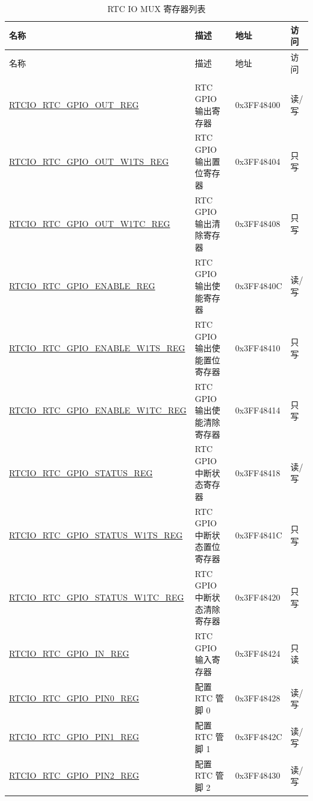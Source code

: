 \begin{longtable}{ | p{6.7cm} | p{6.5cm} | p{1.9cm} | p{0.9cm} | }
\caption{RTC IO MUX 寄存器列表}
\\\hline\rowcolor{lightgray}
名称 & 描述 &  地址 & 访问 \\ \hline
\endfirsthead
\hline\rowcolor{lightgray}
名称 & 描述 &  地址 & 访问 \\ \hline
\endhead
\endfoot
\multicolumn{4}{|l|}{\textbf{GPIO 配置／数据寄存器}} \\ \hline
\hyperref[regdesc:RTCIORTCGPIOOUTREG]{RTCIO\_RTC\_GPIO\_OUT\_REG} & RTC GPIO 输出寄存器 & 0x3FF48400 & 读/写 \\ \hline
\hyperref[regdesc:RTCIORTCGPIOOUTW1TSREG]{RTCIO\_RTC\_GPIO\_OUT\_W1TS\_REG} & RTC GPIO 输出置位寄存器 & 0x3FF48404 & 只写 \\ \hline
\hyperref[regdesc:RTCIORTCGPIOOUTW1TCREG]{RTCIO\_RTC\_GPIO\_OUT\_W1TC\_REG} & RTC GPIO 输出清除寄存器 & 0x3FF48408 & 只写 \\ \hline
\hyperref[regdesc:RTCIORTCGPIOENABLEREG]{RTCIO\_RTC\_GPIO\_ENABLE\_REG} & RTC GPIO 输出使能寄存器 & 0x3FF4840C & 读/写 \\ \hline
\hyperref[regdesc:RTCIORTCGPIOENABLEW1TSREG]{RTCIO\_RTC\_GPIO\_ENABLE\_W1TS\_REG} & RTC GPIO 输出使能置位寄存器 & 0x3FF48410 & 只写 \\ \hline
\hyperref[regdesc:RTCIORTCGPIOENABLEW1TCREG]{RTCIO\_RTC\_GPIO\_ENABLE\_W1TC\_REG} & RTC GPIO 输出使能清除寄存器 & 0x3FF48414 & 只写 \\ \hline
\hyperref[regdesc:RTCIORTCGPIOSTATUSREG]{RTCIO\_RTC\_GPIO\_STATUS\_REG} & RTC GPIO 中断状态寄存器 & 0x3FF48418 & 读/写 \\ \hline
\hyperref[regdesc:RTCIORTCGPIOSTATUSW1TSREG]{RTCIO\_RTC\_GPIO\_STATUS\_W1TS\_REG} & RTC GPIO 中断状态置位寄存器 & 0x3FF4841C & 只写 \\ \hline
\hyperref[regdesc:RTCIORTCGPIOSTATUSW1TCREG]{RTCIO\_RTC\_GPIO\_STATUS\_W1TC\_REG} & RTC GPIO 中断状态清除寄存器 & 0x3FF48420 & 只写\\ \hline
\hyperref[regdesc:RTCIORTCGPIOINREG]{RTCIO\_RTC\_GPIO\_IN\_REG} & RTC GPIO 输入寄存器 & 0x3FF48424 & 只读 \\ \hline
\hyperref[regdesc:RTCIORTCGPIOPINnREG]{RTCIO\_RTC\_GPIO\_PIN0\_REG} & 配置 RTC 管脚 0 & 0x3FF48428 & 读/写 \\ \hline
\hyperref[regdesc:RTCIORTCGPIOPINnREG]{RTCIO\_RTC\_GPIO\_PIN1\_REG} & 配置 RTC 管脚 1 & 0x3FF4842C & 读/写 \\ \hline
\hyperref[regdesc:RTCIORTCGPIOPINnREG]{RTCIO\_RTC\_GPIO\_PIN2\_REG} & 配置 RTC 管脚 2 & 0x3FF48430 & 读/写 \\ \hline

\end{longtable}
